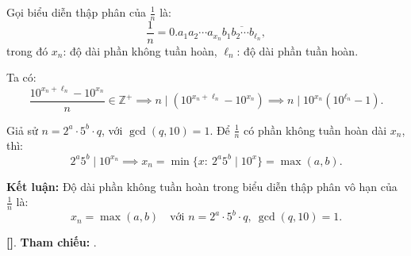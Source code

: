 \documentclass[../2015-n-s.tex]{subfiles}
\begin{document}
\begin{soln}
	
	Gọi biểu diễn thập phân của \( \frac{1}{n} \) là:
	\[
		\frac{1}{n} = 0.a_1a_2 \cdots a_{x_n} \overline{b_1b_2 \cdots b_{\ell_n}},
	\]
	trong đó \( x_n \): độ dài phần không tuần hoàn, \( \ell_n \): độ dài phần tuần hoàn.

	Ta có:
	\[
		\frac{10^{x_n + \ell_n} - 10^{x_n}}{n} \in \mathbb{Z}^+
		\implies n \mid \left(10^{x_n + \ell_n} - 10^{x_n}\right)
		\implies n \mid 10^{x_n}(10^{\ell_n} - 1).
	\]

	Giả sử \( n = 2^a \cdot 5^b \cdot q \), với \( \gcd(q,10)=1 \).
	Để \( \frac{1}{n} \) có phần không tuần hoàn dài \( x_n \), thì:
	\[
		2^a 5^b \mid 10^{x_n}
		\implies x_n = \min\{x:\ 2^a 5^b \mid 10^x\} = \max(a, b).
	\]

	\textbf{Kết luận:} Độ dài phần không tuần hoàn trong biểu diễn thập phân vô hạn của \( \frac{1}{n} \) là:
	\[
		x_n = \max(a, b) \quad \text{với } n = 2^a \cdot 5^b \cdot q,\ \gcd(q, 10) = 1.
	\]
	
	\vspace{1em}
	\textbf{[]}.
	\textbf{Tham chiếu:} .
\end{soln}

\end{document}
